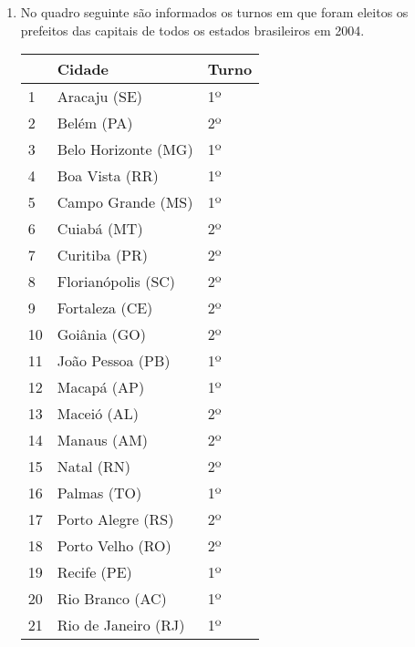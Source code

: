 \documentclass[a4paper,14pt]{article}
\begin{document}
\begin{multicols}{2}
\begin{enumerate}
\begin{table}[H]
			\end{table}
			Lucas assistirá 6 shows e Renata, 4. As melhores opções para Lucas e Renata são, respectivamente, os pacotes:
			\begin{enumerate}[a)]
				\item 1 e 2.
				\item 2 e 3.
				\item 3 e 3.
				\item 2 e 1.
				\item 2 e 2.
			\end{enumerate}
			\item No quadro seguinte são informados os turnos em que foram eleitos os prefeitos das capitais de todos os estados brasileiros em 2004.
			\begin{table}[H]
				\begin{tabular}{|p{0.4cm}|p{4.6cm}|p{2cm}|}
					\hline
				 & \textbf{Cidade} & \textbf{Turno} \\ \hline
					1 & Aracaju (SE) & 1º \\ \hline
					2 & Belém (PA) & 2º \\ \hline
					3 & Belo Horizonte (MG) & 1º \\ \hline
					4 & Boa Vista (RR) & 1º \\ \hline
					5 & Campo Grande (MS) & 1º \\ \hline
					6 & Cuiabá (MT) & 2º \\ \hline
					7 & Curitiba (PR) & 2º \\ \hline
					8 & Florianópolis (SC) & 2º \\ \hline
					9 & Fortaleza (CE) & 2º \\ \hline
					10 & Goiânia (GO) & 2º \\ \hline
					11 & João Pessoa (PB) & 1º \\ \hline
					12 & Macapá (AP) & 1º \\ \hline
					13 & Maceió (AL) & 2º \\ \hline
					14 & Manaus (AM) & 2º \\ \hline
					15 & Natal (RN) & 2º \\ \hline
					16 & Palmas (TO) & 1º \\ \hline
					17 & Porto Alegre (RS) & 2º \\ \hline
					18 & Porto Velho (RO) & 2º \\ \hline
					19 & Recife (PE) & 1º \\ \hline
					20 & Rio Branco (AC) & 1º \\ \hline
					21 & Rio de Janeiro (RJ) & 1º \\ \hline

\end{tabular}
\end{table}
\end{enumerate}
\end{multicols}
\end{document}
